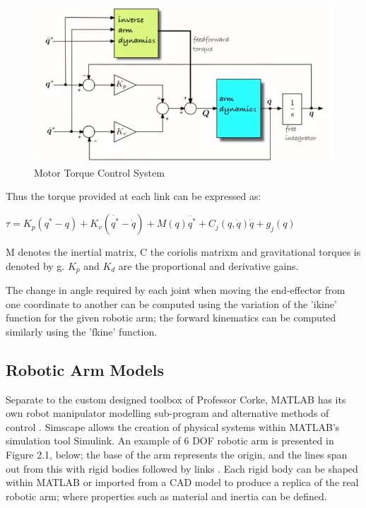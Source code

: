 \documentclass[12pt,openany,a4paper]{book}
\begin{document}
\begin{center}
\begin{figure}[htb]
  \includegraphics[width=\linewidth]{Correcting_for_disturbance_torque.jpg}
\caption{Motor Torque Control System}
\end{figure}
\end{center}

Thus the torque provided at each link can be expressed as:

\begin{center}

$\tau = K_p (q^{*} - q) + K_v (\dot{q^{*}} - \dot{q}) + M(q) \ddot{q^{*}} + C_j (q, \dot{q}) \dot{q} + g_j (q)$

\end{center}


M denotes the inertial matrix, C the coriolis matrixm and gravitational torques is denoted by g. $K_p$ and $K_d$ are the proportional and derivative gains.

The change in angle required by each joint when moving the end-effector from one coordinate to another can be computed using the variation of the 'ikine' function for the given robotic arm; the forward kinematics can be computed similarly using the 'fkine' function.

\subsection{Robotic Arm Models}
Separate to the custom designed toolbox of Professor Corke, MATLAB has its own robot manipulator modelling sub-program and alternative methods of control \cite{MatlabCAD}. Simscape allows the creation of physical systems within MATLAB's simulation tool Simulink. An example of 6 DOF robotic arm is presented in Figure 2.1, below; the base of the arm represents the origin, and the lines span out from this with rigid bodies followed by links \cite{MatlabPI}. Each rigid body can be shaped within MATLAB or imported from a CAD model to produce a replica of the real robotic arm; where properties such as material and inertia can be defined.
\end{document}
